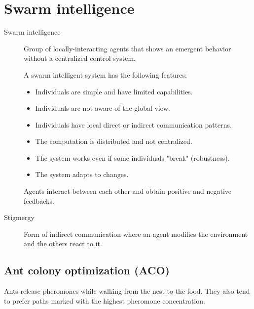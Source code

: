 \chapter{Swarm intelligence}

\begin{description}
    \item[Swarm intelligence] 
        Group of locally-interacting agents that 
        shows an emergent behavior without a centralized control system.

        A swarm intelligent system has the following features:
        \begin{itemize}
            \item Individuals are simple and have limited capabilities.
            \item Individuals are not aware of the global view.
            \item Individuals have local direct or indirect communication patterns.
            \item The computation is distributed and not centralized.
            \item The system works even if some individuals "break" (robustness).
            \item The system adapts to changes.
        \end{itemize}

        Agents interact between each other and obtain positive and negative feedbacks.

    \item[Stigmergy] 
        Form of indirect communication where an agent modifies the environment and the others react to it.
\end{description}



\section{Ant colony optimization (ACO)}


Ants release pheromones while walking from the nest to the food.
They also tend to prefer paths marked with the highest pheromone concentration.

